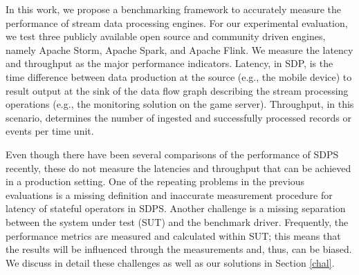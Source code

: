 
In this work, we propose a benchmarking framework to accurately measure the performance of stream data processing engines. For our experimental evaluation, we test three publicly available open source and community driven engines, namely Apache Storm, Apache Spark, and Apache Flink.  
We measure the latency and throughput as the major performance indicators. Latency, in SDP, is the time difference between data production at the source (e.g., the mobile device) to result output at the sink of the data flow graph describing the stream processing operations (e.g., the monitoring solution on the game server). Throughput, in this scenario, determines the number of ingested and successfully processed records or events per time unit.

Even though there have been several comparisons of the performance of SDPS recently, these do not measure the latencies and throughput that can be achieved in a production setting. One of the repeating problems in the previous evaluations is a missing definition and inaccurate measurement procedure for latency of stateful operators in SDPS. Another challenge is a missing separation between the system under test (SUT) and the benchmark driver. Frequently, the performance metrics are measured and calculated within SUT; this means that the results will be influenced through the measurements and, thus, can be biased. %
We discuss in detail these challenges as well as our solutions in Section \ref{chal}.


